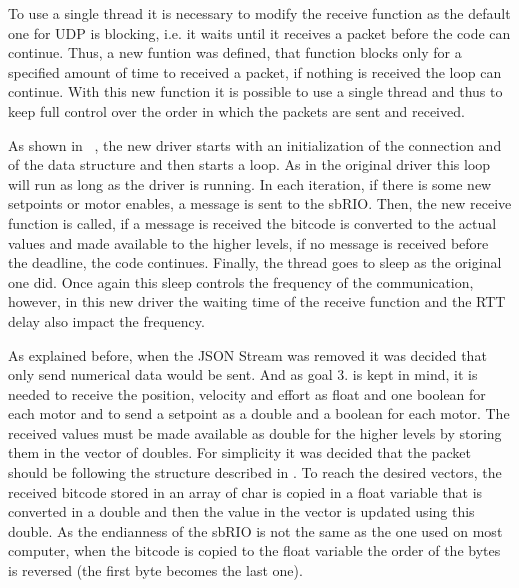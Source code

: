 To use a single thread it is necessary to modify the receive function as the default one for UDP is blocking, i.e. it waits until it receives a packet before the code can continue. Thus, a new funtion was defined, that function blocks only for a specified amount of time to received a packet, if nothing is received the loop can continue. With this new function it is possible to use a single thread and thus to keep full control over the order in which the packets are sent and received.

As shown in ~, the new driver starts with an initialization of the connection and of the data structure and then starts a loop. As in the original driver this loop will run as long as the driver is running. In each iteration, if there is some new setpoints or motor enables, a message is sent to the sbRIO. Then, the new receive function is called, if a message is received the bitcode is converted to the actual values and made available to the higher levels, if no message is received before the deadline, the code continues. Finally, the thread goes to sleep as the original one did. Once again this sleep controls the frequency of the communication, however, in this new driver the waiting time of the receive function and the \gls{RTT} delay also impact the frequency. 

 As explained before, when the \gls{JSON} Stream was removed it was decided that only send numerical data would be sent. And as goal 3. is kept in mind, it is needed to receive the position, velocity and effort as float and one boolean for each motor and to send a setpoint as a double and a boolean for each motor. The received values must be made available as double for the higher levels by storing them in the vector of doubles. For simplicity it was decided that the packet should be following the structure described in . To reach the desired vectors, the received bitcode stored in an array of char is copied in a float variable that is converted in a double and then the value in the vector is updated using this double. As the endianness of the sbRIO is not the same as the one used on most computer, when the bitcode is copied to the float variable the order of the bytes is reversed (the first byte becomes the last one).

